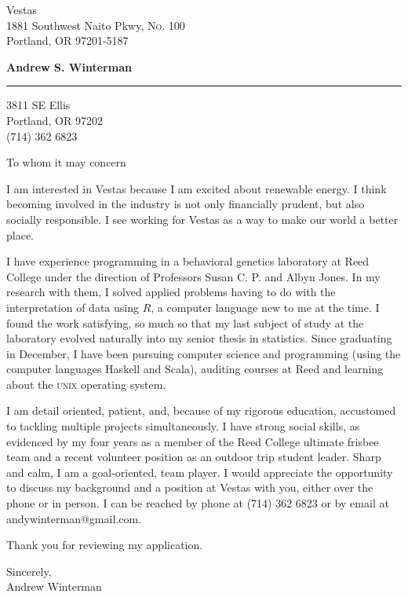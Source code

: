 \documentclass[11pt]{letter} %
\begin{document}
\longindentation=0pt                       %
\let\raggedleft\raggedright                %
\begin{letter}{Vestas \\
1881 Southwest Naito Pkwy, \textsc{No. 100} \\ Portland, OR 97201-5187\\ 
}
\begin{center}
\large \bf{Andrew S. Winterman} 
\end{center}
\medskip\hrule height 1pt
\begin{center}
3811 SE Ellis \\ Portland, OR 97202 \\ (714) 362 6823
\end{center}  
\opening{To whom it may concern} 

I am interested in Vestas because I am excited about renewable
energy. I think becoming involved in the industry is not only
financially prudent, but also socially responsible. I see working for
Vestas as a way to make our world a better place. 

I have experience programming in a behavioral genetics laboratory at
Reed College under the direction of Professors Susan C. P.  and
Albyn Jones. In my research with them, I solved applied problems
having to do with the interpretation of data using $R$, a computer
language new to me at the time. I found the work satisfying, so much
so that my last subject of study at the laboratory evolved naturally
into my senior thesis in statistics. Since graduating in December, I
have been pursuing computer science and programming (using  the
computer languages Haskell and Scala), auditing courses at Reed and learning
about the \textsc{unix} operating system.
 
I am detail oriented, patient, and, because of my rigorous education,
accustomed to tackling multiple projects simultaneously. I have strong
social skills, as evidenced by my four years as a member of the Reed
College ultimate frisbee team and a recent volunteer position as an
outdoor trip student leader. Sharp and calm, I am a goal-oriented, team
player. I would appreciate the opportunity to discuss my
background and a position at Vestas  with you, either over the phone or in
person. I can be reached by phone at (714) 362 6823 or by email at
andywinterman@gmail.com.

Thank you for reviewing my application.

Sincerely, \\
Andrew Winterman
\end{letter}
 
\end{document}
